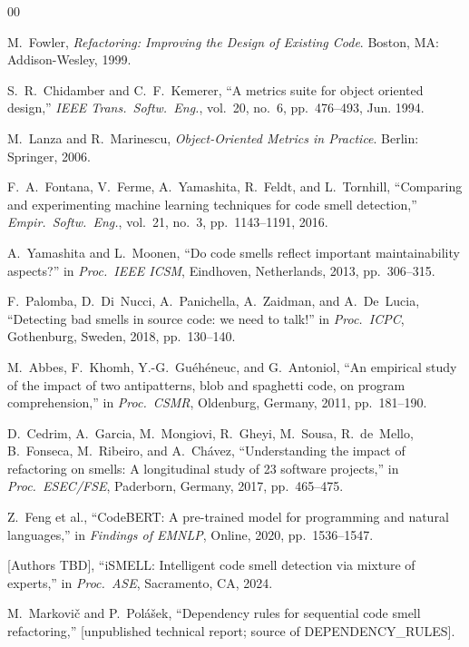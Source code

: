 \documentclass[conference]{IEEEtran}
\begin{document}
\begin{thebibliography}{00}

M.~Fowler,
\emph{Refactoring: Improving the Design of Existing Code}.
Boston, MA: Addison-Wesley, 1999.

S.~R.~Chidamber and C.~F.~Kemerer,
``A metrics suite for object oriented design,''
\emph{IEEE Trans.\ Softw.\ Eng.},
vol.~20, no.~6, pp.~476--493, Jun. 1994.

M.~Lanza and R.~Marinescu,
\emph{Object-Oriented Metrics in Practice}.
Berlin: Springer, 2006.

F.~A.~Fontana, V.~Ferme, A.~Yamashita, R.~Feldt, and L.~Tornhill,
``Comparing and experimenting machine learning techniques for code
smell detection,''
\emph{Empir.\ Softw.\ Eng.}, vol.~21, no.~3, pp.~1143--1191, 2016.

A.~Yamashita and L.~Moonen,
``Do code smells reflect important maintainability aspects?''
in \emph{Proc.\ IEEE ICSM}, Eindhoven, Netherlands, 2013,
pp.~306--315.

F.~Palomba, D.~Di~Nucci, A.~Panichella, A.~Zaidman, and A.~De~Lucia,
``Detecting bad smells in source code: we need to talk!''
in \emph{Proc.\ ICPC}, Gothenburg, Sweden, 2018, pp.~130--140.

M.~Abbes, F.~Khomh, Y.-G.~Gu{\'e}h{\'e}neuc, and G.~Antoniol,
``An empirical study of the impact of two antipatterns, blob and
spaghetti code, on program comprehension,''
in \emph{Proc.\ CSMR}, Oldenburg, Germany, 2011, pp.~181--190.

D.~Cedrim, A.~Garcia, M.~Mongiovi, R.~Gheyi, M.~Sousa,
R.~de~Mello, B.~Fonseca, M.~Ribeiro, and A.~Ch{\'a}vez,
``Understanding the impact of refactoring on smells: A longitudinal
study of 23 software projects,''
in \emph{Proc.\ ESEC/FSE}, Paderborn, Germany, 2017, pp.~465--475.

Z.~Feng et al.,
``CodeBERT: A pre-trained model for programming and natural
languages,''
in \emph{Findings of EMNLP}, Online, 2020, pp.~1536--1547.

[Authors TBD],
``iSMELL: Intelligent code smell detection via mixture of experts,''
in \emph{Proc.\ ASE}, Sacramento, CA, 2024.

M.~Markovič and P.~Polášek,
``Dependency rules for sequential code smell refactoring,''
[unpublished technical report; source of DEPENDENCY\_RULES].


\end{thebibliography}
\end{document}
